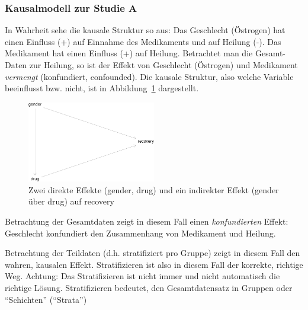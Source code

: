 \documentclass[
  a4paper,
  DIV=11]{scrreprt}
\theoremstyle{definition}
\theoremstyle{remark}
\begin{document}
\hypertarget{kausalmodell-zur-studie-a}{%
\subsubsection{Kausalmodell zur Studie
A}\label{kausalmodell-zur-studie-a}}

In Wahrheit sehe die kausale Struktur so aus: Das Geschlecht (Östrogen)
hat einen Einfluss (+) auf Einnahme des Medikaments und auf Heilung (-).
Das Medikament hat einen Einfluss (+) auf Heilung. Betrachtet man die
Gesamt-Daten zur Heilung, so ist der Effekt von Geschlecht (Östrogen)
und Medikament \emph{vermengt} (konfundiert, confounded). Die kausale
Struktur, also welche Variable beeinflusst bzw. nicht, ist in
Abbildung~\ref{fig-dag-studie-a} dargestellt.

\begin{figure}

{\centering \includegraphics[width=0.5\textwidth,height=\textheight]{./kausal_files/figure-pdf/fig-dag-studie-a-1.pdf}

}

\caption{\label{fig-dag-studie-a}Zwei direkte Effekte (gender, drug) und
ein indirekter Effekt (gender über drug) auf recovery}

\end{figure}

Betrachtung der Gesamtdaten zeigt in diesem Fall einen
\emph{konfundierten} Effekt: Geschlecht konfundiert den Zusammenhang von
Medikament und Heilung.

\begin{tcolorbox}[enhanced jigsaw, leftrule=.75mm, left=2mm, bottomrule=.15mm, opacityback=0, coltitle=black, colbacktitle=quarto-callout-important-color!10!white, opacitybacktitle=0.6, rightrule=.15mm, toptitle=1mm, colback=white, colframe=quarto-callout-important-color-frame, arc=.35mm, toprule=.15mm, breakable, titlerule=0mm, bottomtitle=1mm, title=\textcolor{quarto-callout-important-color}{\faExclamation}\hspace{0.5em}{Wichtig}]
Betrachtung der Teildaten (d.h. stratifiziert pro Gruppe) zeigt in
diesem Fall den wahren, kausalen Effekt. Stratifizieren ist also in
diesem Fall der korrekte, richtige Weg. Achtung: Das Stratifizieren ist
nicht immer und nicht automatisch die richtige Lösung. Stratifizieren
bedeutet, den Gesamtdatensatz in Gruppen oder ``Schichten'' (``Strata'')
\end{tcolorbox}
\end{document}
